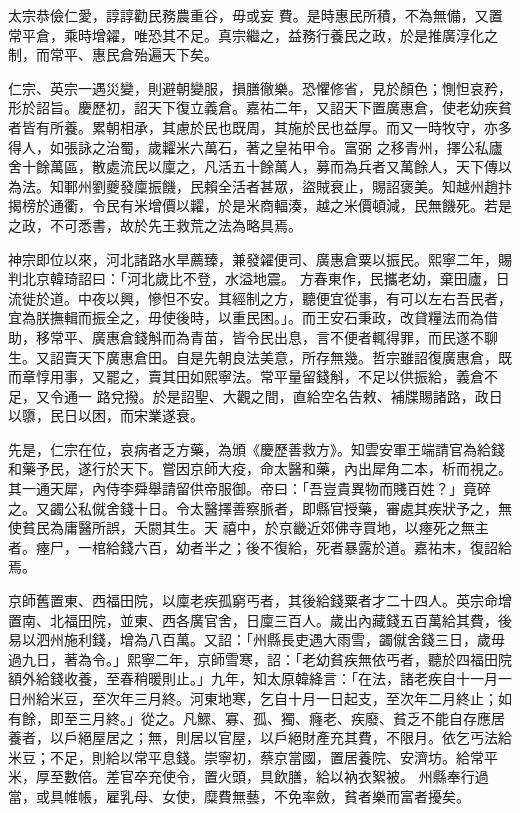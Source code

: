 \begin{pinyinscope}
 太宗恭儉仁愛，諄諄勸民務農重谷，毋或妄
 費。是時惠民所積，不為無備，又置常平倉，乘時增糴，唯恐其不足。真宗繼之，益務行養民之政，於是推廣淳化之制，而常平、惠民倉殆遍天下矣。



 仁宗、英宗一遇災變，則避朝變服，損膳徹樂。恐懼修省，見於顏色；惻怛哀矜，形於詔旨。慶歷初，詔天下復立義倉。嘉祐二年，又詔天下置廣惠倉，使老幼疾貧者皆有所養。累朝相承，其慮於民也既周，其施於民也益厚。而又一時牧守，亦多得人，如張詠之治蜀，歲糶米六萬石，著之皇祐甲令。富弼
 之移青州，擇公私廬舍十餘萬區，散處流民以廩之，凡活五十餘萬人，募而為兵者又萬餘人，天下傳以為法。知鄆州劉夔發廩振饑，民賴全活者甚眾，盜賊衰止，賜詔褒美。知越州趙抃揭榜於通衢，令民有米增價以糶，於是米商輻湊，越之米價頓減，民無饑死。若是之政，不可悉書，故於先王救荒之法為略具焉。



 神宗即位以來，河北諸路水旱薦臻，兼發糴便司、廣惠倉粟以振民。熙寧二年，賜判北京韓琦詔曰：「河北歲比不登，水溢地震。
 方春東作，民攜老幼，棄田廬，日流徙於道。中夜以興，慘怛不安。其經制之方，聽便宜從事，有可以左右吾民者，宜為朕撫輯而振全之，毋使後時，以重民困。」。而王安石秉政，改貸糧法而為借助，移常平、廣惠倉錢斛而為青苗，皆令民出息，言不便者輒得罪，而民遂不聊生。又詔賣天下廣惠倉田。自是先朝良法美意，所存無幾。哲宗雖詔復廣惠倉，既而章惇用事，又罷之，賣其田如熙寧法。常平量留錢斛，不足以供振給，義倉不足，又令通一
 路兌撥。於是詔聖、大觀之間，直給空名告敕、補牒賜諸路，政日以隳，民日以困，而宋業遂衰。



 先是，仁宗在位，哀病者乏方藥，為頒《慶歷善救方》。知雲安軍王端請官為給錢和藥予民，遂行於天下。嘗因京師大疫，命太醫和藥，內出犀角二本，析而視之。其一通天犀，內侍李舜舉請留供帝服御。帝曰：「吾豈貴異物而賤百姓？」竟碎之。又蠲公私僦舍錢十日。令太醫擇善察脈者，即縣官授藥，審處其疾狀予之，無使貧民為庸醫所誤，夭閼其生。天
 禧中，於京畿近郊佛寺買地，以瘞死之無主者。瘞尸，一棺給錢六百，幼者半之；後不復給，死者暴露於道。嘉祐末，復詔給焉。



 京師舊置東、西福田院，以廩老疾孤窮丐者，其後給錢粟者才二十四人。英宗命增置南、北福田院，並東、西各廣官舍，日廩三百人。歲出內藏錢五百萬給其費，後易以泗州施利錢，增為八百萬。又詔：「州縣長吏遇大雨雪，蠲僦舍錢三日，歲毋過九日，著為令。」熙寧二年，京師雪寒，詔：「老幼貧疾無依丐者，聽於四福田院
 額外給錢收養，至春稍暖則止。」九年，知太原韓絳言：「在法，諸老疾自十一月一日州給米豆，至次年三月終。河東地寒，乞自十月一日起支，至次年二月終止；如有餘，即至三月終。」從之。凡鰥、寡、孤、獨、癃老、疾廢、貧乏不能自存應居養者，以戶絕屋居之；無，則居以官屋，以戶絕財產充其費，不限月。依乞丐法給米豆；不足，則給以常平息錢。崇寧初，蔡京當國，置居養院、安濟坊。給常平米，厚至數倍。差官卒充使令，置火頭，具飲膳，給以衲衣絮被。
 州縣奉行過當，或具帷帳，雇乳母、女使，糜費無藝，不免率斂，貧者樂而富者擾矣。




\end{pinyinscope}
